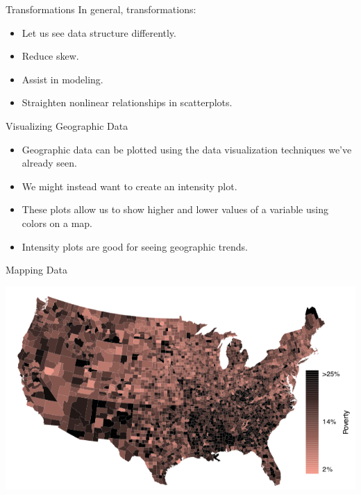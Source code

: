 \begin{frame}{Transformations}
    In general, transformations:
    \begin{itemize}
        \item Let us see data structure differently.
        \item Reduce skew.
        \item Assist in modeling.
        \item Straighten nonlinear relationships in scatterplots.
    \end{itemize}
\end{frame}

\begin{frame}{Visualizing Geographic Data}
    \begin{itemize}
        \item Geographic data can be plotted using the data visualization techniques we've already seen.
        \item We might instead want to create an intensity plot.
        \item These plots allow us to show higher and lower values of a variable using colors on a map.
        \item Intensity plots are good for seeing geographic trends.
    \end{itemize}
\end{frame}

\begin{frame}{Mapping Data}
    \begin{center}
        \includegraphics[scale=0.5]{images/map.png}
    \end{center}
\end{frame}

